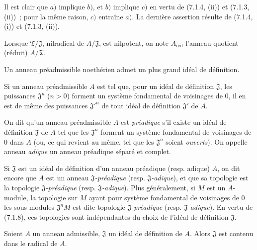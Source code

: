 Il est clair que $a)$ implique $b)$, et $b)$ implique $c)$ en vertu de
(7.1.4, (ii)) et (7.1.3, (ii))~; pour la même raison, $c)$ entraîne $a)$. La
dernière assertion résulte de (7.1.4, (i)) et (7.1.3, (ii)).

Lorsque $\mathfrak T/\mathfrak J$, nilradical de $A/\mathfrak J$, est
nilpotent, on note $A_{\mathrm{red}}$ l'anneau quotient (réduit)
$A/\mathfrak T$.


\begin{corollary}[7.1.7]
\label{0.7.1.7-fr}
Un anneau préadmissible noethérien admet un plus grand idéal de définition.
\end{corollary}

\begin{corollary}[7.1.8]
\label{0.7.1.8-fr}
Si un anneau préadmissible $A$ est tel que, pour un idéal de définition
$\mathfrak J$, les puissances $\mathfrak J^n$ ($n>0$) forment un système
fondamental de voisinages de $0$, il en est de même des puissances
${\mathfrak J'}^n$ de tout idéal de définition $\mathfrak J'$ de $A$.
\end{corollary}

\begin{definition}[7.1.9]
\label{0.7.1.9-fr}
On dit qu'un anneau préadmissible $A$ est \emph{préadique} s'il existe un idéal de
définition $\mathfrak J$ de $A$ tel que les $\mathfrak J^n$ forment un système
fondamental de voisinages de $0$ dans $A$ \textup{(ou, ce qui revient au même, tel que
les $\mathfrak J^n$ soient \emph{ouverts})}. On appelle anneau \emph{adique} un anneau
préadique séparé et complet.
\end{definition}

Si $\mathfrak J$ est un idéal de définition d'un anneau préadique (resp.
adique) $A$, on dit encore que $A$ est un anneau
\emph{$\mathfrak J$-préadique} (resp. \emph{$\mathfrak J$-adique}), et que sa
topologie est la topologie \emph{$\mathfrak J$-préadique} (resp.
\emph{$\mathfrak J$-adique}). Plus généralement, si $M$ est un $A$-module, la
topologie sur $M$ ayant pour système fondamental de voisinages de $0$ les
sous-modules $\mathfrak J^nM$ est dite topologie
\emph{$\mathfrak J$-préadique} (resp. \emph{$\mathfrak J$-adique}). En vertu
de (7.1.8), ces topologies sont indépendantes du choix de l'idéal de définition
$\mathfrak J$.

\begin{proposition}[7.1.10]
\label{0.7.1.10-fr}
Soient $A$ un anneau admissible, $\mathfrak J$ un idéal de définition de $A$.
Alors $\mathfrak J$ est contenu dans le radical de $A$.
\end{proposition}

